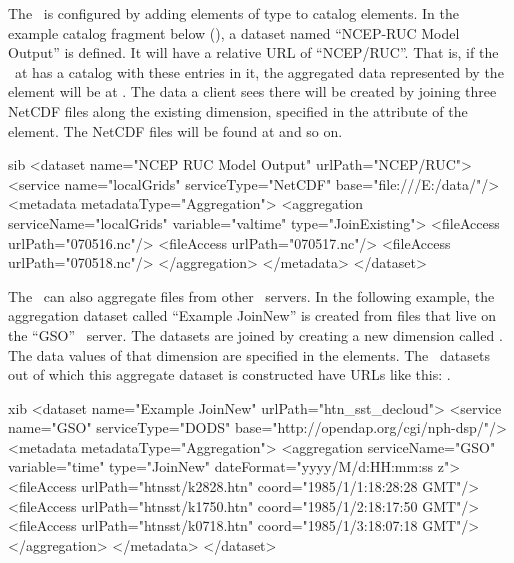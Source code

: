 \documentclass{dods-book}
\begin{document}
The \AggServer\ is configured by adding  elements of
type  to catalog  elements.  In
the example catalog fragment below (), a dataset named
``NCEP-RUC Model Output'' is defined. It will have a relative URL of
``NCEP/RUC''.  That is, if the \aggser\ at 
has a catalog with these entries in it, the aggregated data
represented by the  element will be at
.  The data a client sees there will
be created by joining three NetCDF files along the existing
 dimension, specified in the  attribute of
the  element. The NetCDF files will be found at
 and so on.

\begin{vcode}{sib}
<dataset name="NCEP RUC Model Output" urlPath="NCEP/RUC">
  <service name="localGrids" serviceType="NetCDF" 
    base="file:///E:/data/"/>
  <metadata metadataType="Aggregation">
    <aggregation serviceName="localGrids" 
        variable="valtime" type="JoinExisting">
      <fileAccess urlPath="070516.nc"/>
      <fileAccess urlPath="070517.nc"/>
      <fileAccess urlPath="070518.nc"/>
    </aggregation>
  </metadata>
</dataset>
\end{vcode}

The \aggser\ can also aggregate files from other \opendap\ servers. In 
the following example, the aggregation dataset called ``Example
JoinNew'' is created from files that live on the ``GSO'' \opendap\ 
server. The datasets are joined by creating a new dimension called
\lit{time}. The data values of that dimension are specified in the
\tag{fileAccess} elements. The \opendap\ datasets out of which this
aggregate dataset is constructed have URLs like this:
.

\begin{vcode}{xib}
<dataset name="Example JoinNew" urlPath="htn_sst_decloud">
  <service name="GSO" serviceType="DODS" 
      base="http://opendap.org/cgi/nph-dsp/"/>
  <metadata metadataType="Aggregation">
    <aggregation serviceName="GSO" variable="time" 
      type="JoinNew" dateFormat="yyyy/M/d:HH:mm:ss z">
      <fileAccess urlPath="htnsst/k2828.htn" coord="1985/1/1:18:28:28 GMT"/>
      <fileAccess urlPath="htnsst/k1750.htn" coord="1985/1/2:18:17:50 GMT"/>
      <fileAccess urlPath="htnsst/k0718.htn" coord="1985/1/3:18:07:18 GMT"/>
    </aggregation>
  </metadata>
</dataset>
\end{vcode}
\end{document}
